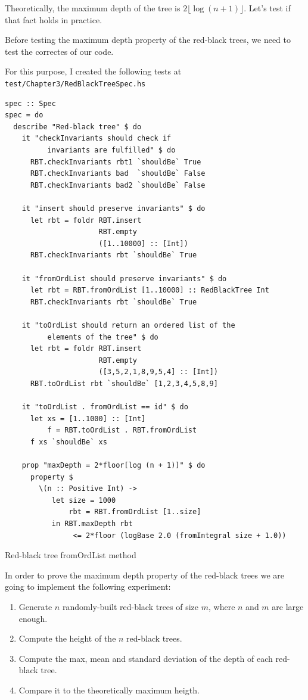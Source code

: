\documentclass[12pt, a4paper]{article} %
\newcommand{\code}[1]{\texttt{#1}} %
\begin{document}
Theoretically, the maximum depth of the tree is $2\lfloor \log (n+1) \rfloor$. Let's test if that fact holds in practice.

Before testing the maximum depth property of the red-black trees, we need to test the correctes of our code.

For this purpose, I created the following tests at \code{test/Chapter3/RedBlackTreeSpec.hs}

\begin{listing}[H]
  \begin{verbatim}
spec :: Spec
spec = do
  describe "Red-black tree" $ do
    it "checkInvariants should check if
          invariants are fulfilled" $ do
      RBT.checkInvariants rbt1 `shouldBe` True
      RBT.checkInvariants bad  `shouldBe` False
      RBT.checkInvariants bad2 `shouldBe` False

    it "insert should preserve invariants" $ do
      let rbt = foldr RBT.insert
                      RBT.empty
                      ([1..10000] :: [Int])
      RBT.checkInvariants rbt `shouldBe` True

    it "fromOrdList should preserve invariants" $ do
      let rbt = RBT.fromOrdList [1..10000] :: RedBlackTree Int
      RBT.checkInvariants rbt `shouldBe` True

    it "toOrdList should return an ordered list of the
          elements of the tree" $ do
      let rbt = foldr RBT.insert
                      RBT.empty
                      ([3,5,2,1,8,9,5,4] :: [Int])
      RBT.toOrdList rbt `shouldBe` [1,2,3,4,5,8,9]

    it "toOrdList . fromOrdList == id" $ do
      let xs = [1..1000] :: [Int]
          f = RBT.toOrdList . RBT.fromOrdList
      f xs `shouldBe` xs

    prop "maxDepth = 2*floor[log (n + 1)]" $ do
      property $
        \(n :: Positive Int) ->
           let size = 1000
               rbt = RBT.fromOrdList [1..size]
           in RBT.maxDepth rbt
                <= 2*floor (logBase 2.0 (fromIntegral size + 1.0))
  \end{verbatim}
  \caption{Red-black tree fromOrdList method}
  \label{lst:fromOrdList}
\end{listing}

In order to prove the maximum depth property of the red-black trees we are going to implement the following experiment:

\begin{enumerate}
  \item Generate $n$ randomly-built red-black trees of size $m$, where $n$ and $m$ are large enough.
  \item Compute the height of the $n$ red-black trees.
  \item Compute the max, mean and standard deviation of the depth of each red-black tree.
  \item Compare it to the theoretically maximum heigth.
\end{enumerate}
\end{document}

